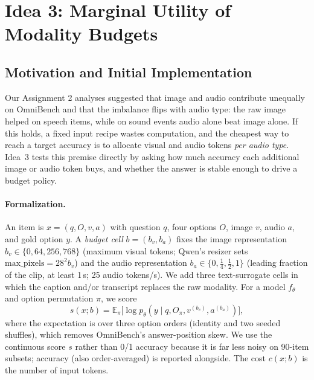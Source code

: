 
\section{Idea 3: Marginal Utility of Modality Budgets}
\label{sec:idea3}

\subsection{Motivation and Initial Implementation}

Our Assignment 2 analyses suggested that image and audio contribute unequally on
OmniBench and that the imbalance flips with audio type: the raw image helped
on speech items, while on sound events audio alone beat image alone. If this
holds, a fixed input recipe wastes computation, and the cheapest way to reach
a target accuracy is to allocate visual and audio tokens \emph{per audio
type}. Idea~3 tests this premise directly by asking how much accuracy each
additional image or audio token buys, and whether the answer is stable enough
to drive a budget policy.

\paragraph{Formalization.} An item is $x=(q,O,v,a)$ with question $q$, four
options $O$, image $v$, audio $a$, and gold option $y$. A \emph{budget cell}
$b=(b_v,b_a)$ fixes the image representation $b_v\in\{0,64,256,768\}$
(maximum visual tokens; Qwen's resizer sets $\text{max\_pixels}=28^2 b_v$) and
the audio representation $b_a\in\{0,\tfrac14,\tfrac12,1\}$ (leading fraction
of the clip, at least 1\,s; 25 audio tokens/s). We add three text-surrogate
cells in which the caption and/or transcript replaces the raw modality. For a
model $f_\theta$ and option permutation $\pi$, we score
\begin{equation}
s(x;b)=\mathbb{E}_{\pi}\big[\log p_\theta(y\mid q,O_\pi,v^{(b_v)},a^{(b_a)})\big],
\end{equation}
where the expectation is over three option orders (identity and two seeded
shuffles), which removes OmniBench's answer-position skew. We use the
continuous score $s$ rather than 0/1 accuracy because it is far less noisy on
90-item subsets; accuracy (also order-averaged) is reported alongside. The
cost $c(x;b)$ is the number of input tokens.

